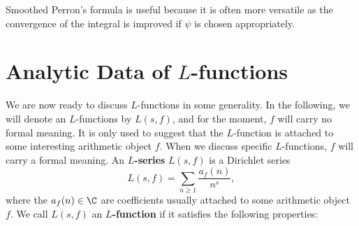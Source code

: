     Smoothed Perron's formula is useful because it is often more versatile as the convergence of the integral is improved if $\psi$ is chosen appropriately.
  \section{Analytic Data of \texorpdfstring{$L$}{L}-functions}
    We are now ready to discuss $L$-functions in some generality. In the following, we will denote an $L$-functions by $L(s,f)$, and for the moment, $f$ will carry no formal meaning. It is only used to suggest that the $L$-function is attached to some interesting arithmetic object $f$. When we discuss specific $L$-functions, $f$ will carry a formal meaning. An \textbf{$L$-series} $L(s,f)$ is a Dirichlet series
    \[
      L(s,f) = \sum_{n \ge 1}\frac{a_{f}(n)}{n^{s}},
    \]
    where the $a_{f}(n) \in \C$ are coefficients usually attached to some arithmetic object $f$. We call $L(s,f)$ an \textbf{$L$-function} if it satisfies the following properties:

